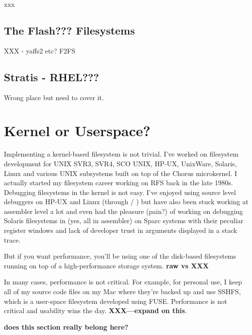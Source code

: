\noindent
xxx

\subsection{The Flash??? Filesystems}

XXX - yaffs2 etc? F2FS 

\subsection{Stratis - RHEL???}

Wrong place but need to cover it.



\section{Kernel or Userspace?}

Implementing a kernel-based filesystem is not trivial. I've worked on filesystem development for UNIX SVR3, SVR4, SCO UNIX, HP-UX, UnixWare, Solaris, Linux and various UNIX subsystems built on top of the Chorus microkernel. I actually started my filesystem career working on RFS back in the late 1980s. Debugging filesystems in the kernel is not easy. I've enjoyed using source level debuggers on HP-UX and Linux (through  / ) but have also been stuck working at assembler level a lot and even had the pleasure (pain?) of working on debugging Solaris filesystems in  (yes, all in assembler) on Sparc systems with their peculiar register windows and lack of developer trust in arguments displayed in a stack trace.

But if you want performance, you'll be using one of the disk-based filesystems running on top of a high-performance storage system. \textbf{raw vs XXX}

In many cases, performance is not critical. For example, for personal use, I keep all of my source code files on my Mac where they're backed up and use SSHFS, which is a user-space filesystem developed using FUSE. Performance is not critical and usability wins the day. \textbf{XXX---expand on this}.

\textbf{does this section really belong here?}


